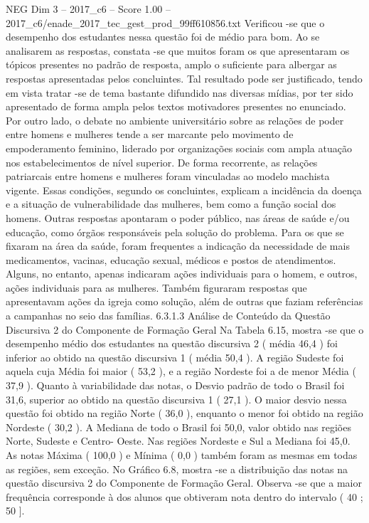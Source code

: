 \begin{textsample}{NEG Dim 3 – 2017\_c6 – Score 1.00 – 2017\_c6/enade\_2017\_tec\_gest\_prod\_99ff610856.txt}
Verificou -se que o desempenho dos estudantes nessa questão foi de médio para bom.
Ao se analisarem as respostas, constata -se que muitos foram os que apresentaram os tópicos presentes no padrão de resposta, amplo o suficiente para albergar as respostas apresentadas pelos concluintes.
Tal resultado pode ser justificado, tendo em vista tratar -se de tema bastante difundido nas diversas mídias, por ter sido apresentado de forma ampla pelos textos motivadores presentes no enunciado.
Por outro lado, o debate no ambiente universitário sobre as relações de poder entre homens e mulheres tende a ser marcante pelo movimento de empoderamento feminino, liderado por organizações sociais com ampla atuação nos estabelecimentos de nível superior.
De forma recorrente, as relações patriarcais entre homens e mulheres foram vinculadas ao modelo machista vigente.
Essas condições, segundo os concluintes, explicam a incidência da doença e a situação de vulnerabilidade das mulheres, bem como a função social dos homens.
Outras respostas apontaram o poder público, nas áreas de saúde e/ou educação, como órgãos responsáveis pela solução do problema.
Para os que se fixaram na área da saúde, foram frequentes a indicação da necessidade de mais medicamentos, vacinas, educação sexual, médicos e postos de atendimentos.
Alguns, no entanto, apenas indicaram ações individuais para o homem, e outros, ações individuais para as mulheres.
Também figuraram respostas que apresentavam ações da igreja como solução, além de outras que faziam referências a campanhas no seio das famílias. 6.3.1.3 Análise de Conteúdo da Questão Discursiva 2 do Componente de Formação Geral Na Tabela 6.15, mostra -se que o desempenho médio dos estudantes na questão discursiva 2 ( média 46,4 ) foi inferior ao obtido na questão discursiva 1 ( média 50,4 ).
A região Sudeste foi aquela cuja Média foi maior ( 53,2 ), e a região Nordeste foi a de menor Média ( 37,9 ).
Quanto à variabilidade das notas, o Desvio padrão de todo o Brasil foi 31,6, superior ao obtido na questão discursiva 1 ( 27,1 ).
O maior desvio nessa questão foi obtido na região Norte ( 36,0 ), enquanto o menor foi obtido na região Nordeste ( 30,2 ).
A Mediana de todo o Brasil foi 50,0, valor obtido nas regiões Norte, Sudeste e Centro- Oeste.
Nas regiões Nordeste e Sul a Mediana foi 45,0.
As notas Máxima ( 100,0 ) e Mínima ( 0,0 ) também foram as mesmas em todas as regiões, sem exceção.
No Gráfico 6.8, mostra -se a distribuição das notas na questão discursiva 2 do Componente de Formação Geral.
Observa -se que a maior frequência corresponde à dos alunos que obtiveram nota dentro do intervalo ( 40 ; 50 ].

\end{textsample}
